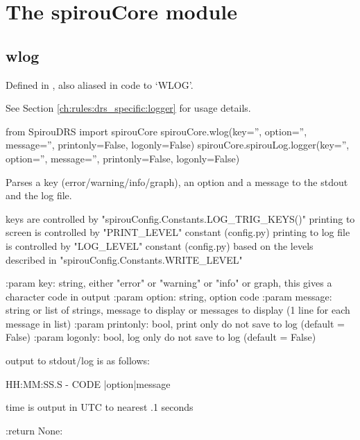 
\clearpage
\newpage
\noindent\begin{minipage}{\textwidth}
\section{The spirouCore module}
\label{ch:the_module:spirouCore}

\subsection{wlog}
\label{ch:the_module:spirouCore:logger}

Defined in \spirouCore{}, also aliased in code to `WLOG'.

See Section \ref{ch:rules:drs_specific:logger} for usage details.

\begin{pythonbox}
from SpirouDRS import spirouCore
spirouCore.wlog(key='', option='', message='', printonly=False, logonly=False)
spirouCore.spirouLog.logger(key='', option='', message='', printonly=False, logonly=False)
\end{pythonbox}

\begin{pythondocstring}
Parses a key (error/warning/info/graph), an option and a message to the
stdout and the log file.

keys are controlled by "spirouConfig.Constants.LOG_TRIG_KEYS()"
printing to screen is controlled by "PRINT_LEVEL" constant (config.py)
printing to log file is controlled by "LOG_LEVEL" constant (config.py)
based on the levels described in "spirouConfig.Constants.WRITE_LEVEL"

:param key: string, either "error" or "warning" or "info" or graph, this
            gives a character code in output
:param option: string, option code
:param message: string or list of strings, message to display or messages
                to display (1 line for each message in list)
:param printonly: bool, print only do not save to log (default = False)
:param logonly: bool, log only do not save to log (default = False)

output to stdout/log is as follows:

    HH:MM:SS.S - CODE |option|message

time is output in UTC to nearest .1 seconds

:return None:
\end{pythondocstring}
\end{minipage}

